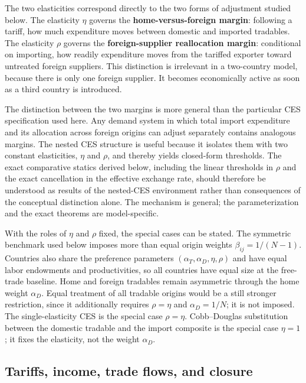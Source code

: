 \documentclass[11pt]{article}
\begin{document}
The two elasticities correspond directly to the two forms of adjustment studied below. The elasticity $\eta$ governs the \textbf{home-versus-foreign margin}: following a tariff, how much expenditure moves between domestic and imported tradables. The elasticity $\rho$ governs the \textbf{foreign-supplier reallocation margin}: conditional on importing, how readily expenditure moves from the tariffed exporter toward untreated foreign suppliers. This distinction is irrelevant in a two-country model, because there is only one foreign supplier. It becomes economically active as soon as a third country is introduced.

The distinction between the two margins is more general than the particular CES specification used here. Any demand system in which total import expenditure and its allocation across foreign origins can adjust separately contains analogous margins. The nested CES structure is useful because it isolates them with two constant elasticities, $\eta$ and $\rho$, and thereby yields closed-form thresholds. The exact comparative statics derived below, including the linear thresholds in $\rho$ and the exact cancellation in the effective exchange rate, should therefore be understood as results of the nested-CES environment rather than consequences of the conceptual distinction alone. The mechanism is general; the parameterization and the exact theorems are model-specific.

With the roles of $\eta$ and $\rho$ fixed, the special cases can be stated. The symmetric benchmark used below imposes more than equal origin weights $\beta_{ij} = 1/(N-1)$. Countries also share the preference parameters $(\alpha_T, \alpha_D, \eta, \rho)$ and have equal labor endowments and productivities, so all countries have equal size at the free-trade baseline. Home and foreign tradables remain asymmetric through the home weight $\alpha_D$. Equal treatment of all tradable origins would be a still stronger restriction, since it additionally requires $\rho = \eta$ and $\alpha_D = 1/N$; it is not imposed. The single-elasticity CES is the special case $\rho = \eta$. Cobb--Douglas substitution between the domestic tradable and the import composite is the special case $\eta = 1$; it fixes the elasticity, not the weight $\alpha_D$.

\subsection{Tariffs, income, trade flows, and closure}
\end{document}
